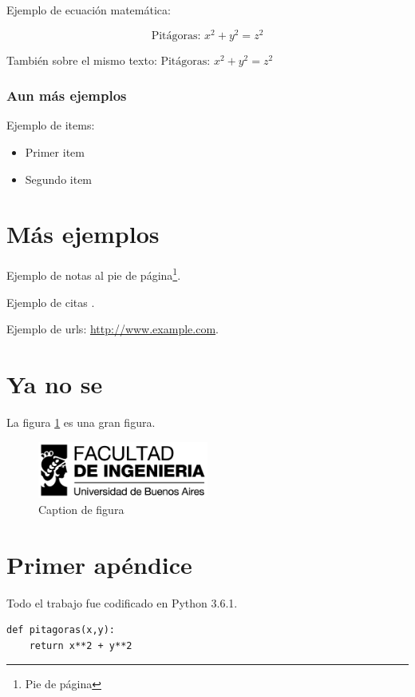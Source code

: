 \documentclass[a4paper]{article}
\begin{document}
Ejemplo de ecuación matemática: 

\[ \text{Pitágoras: }x^2 + y^2 = z^2 \]

También sobre el mismo texto: \( \text{Pitágoras: }x^2 + y^2 = z^2 \)

\subsubsection{Aun más ejemplos}

Ejemplo de items:

\begin{itemize}
\item Primer item
\item Segundo item
\end{itemize}

\section{Más ejemplos}

Ejemplo de notas al pie de página\footnote{Pie de página}.

Ejemplo de citas \cite{Cormen}.

Ejemplo de urls: \url{http://www.example.com}.

\section{Ya no se}

La figura \ref{fig:fiuba} es una gran figura.
\begin{figure}[!hb]
  \centering
    \includegraphics[width=0.5\textwidth]{fiuba.jpg}
  \caption{Caption de figura}
  \label{fig:fiuba}
\end{figure}

\newpage
\appendix

\section{Primer apéndice}

Todo el trabajo fue codificado en Python 3.6.1.

\begin{lstlisting}
def pitagoras(x,y):
    return x**2 + y**2
\end{lstlisting}
\end{document}

